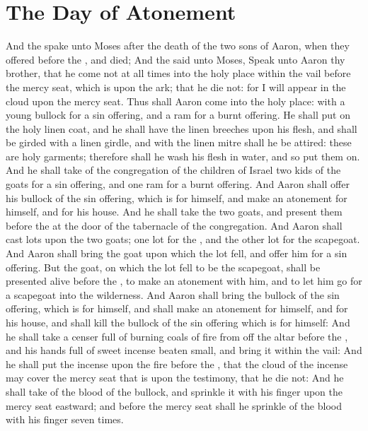 \section*{The Day of Atonement}
\begin{biblechapter} %
\verse And the \LORD spake unto Moses after the death of the two sons of Aaron, when they offered before the \LORD, and died;
\verse And the \LORD said unto Moses, Speak unto Aaron thy brother, that he come not at all times into the holy place within the vail before the mercy seat, which is upon the ark; that he die not: for I will appear in the cloud upon the mercy seat.
\verse Thus shall Aaron come into the holy place: with a young bullock for a sin offering, and a ram for a burnt offering.
\verse He shall put on the holy linen coat, and he shall have the linen breeches upon his flesh, and shall be girded with a linen girdle, and with the linen mitre shall he be attired: these are holy garments; therefore shall he wash his flesh in water, and so put them on.
\verse And he shall take of the congregation of the children of Israel two kids of the goats for a sin offering, and one ram for a burnt offering.
\verse And Aaron shall offer his bullock of the sin offering, which is for himself, and make an atonement for himself, and for his house.
\verse And he shall take the two goats, and present them before the \LORD at the door of the tabernacle of the congregation.
\verse And Aaron shall cast lots upon the two goats; one lot for the \LORD, and the other lot for the scapegoat.
\verse And Aaron shall bring the goat upon which the \LORDs lot fell, and offer him for a sin offering.
\verse But the goat, on which the lot fell to be the scapegoat, shall be presented alive before the \LORD, to make an atonement with him, and to let him go for a scapegoat into the wilderness.
\verse And Aaron shall bring the bullock of the sin offering, which is for himself, and shall make an atonement for himself, and for his house, and shall kill the bullock of the sin offering which is for himself:
\verse And he shall take a censer full of burning coals of fire from off the altar before the \LORD, and his hands full of sweet incense beaten small, and bring it within the vail:
\verse And he shall put the incense upon the fire before the \LORD, that the cloud of the incense may cover the mercy seat that is upon the testimony, that he die not:
\verse And he shall take of the blood of the bullock, and sprinkle it with his finger upon the mercy seat eastward; and before the mercy seat shall he sprinkle of the blood with his finger seven times.

\end{biblechapter}
